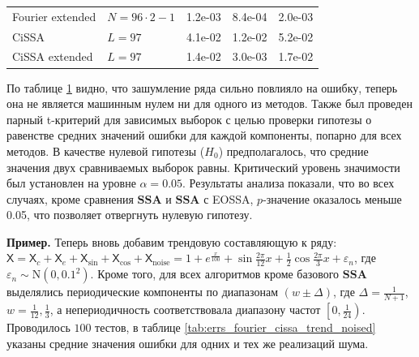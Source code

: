 \documentclass[a4paper, 11pt]{article}
\newcommand{\SSA}{\textbf{SSA}}
\newcommand{\TS}{\mathsf{X}}
\begin{document}
\begin{table}[H]
\begin{tabular}{l|l|ccc}
		Fourier extended   & $N = 96 \cdot 2 - 1$ & 1.2e-03                          & 8.4e-04                          & 2.0e-03                   \\
		CiSSA              & $L = 97$             & 4.1e-02                          & 1.2e-02                          & 5.2e-02                   \\
		CiSSA extended     & $L = 97$             & 1.4e-02                          & 3.0e-03                          & 1.7e-02                   \\
		\hline
	\end{tabular}
	\label{tab:errs_fourier_cissa_sin_cos_noised}
\end{table}



По таблице \ref{tab:errs_fourier_cissa_sin_cos_noised} видно, что зашумление ряда сильно повлияло на ошибку, теперь она не является машинным нулем ни для одного из методов. Также был проведен парный t-критерий для зависимых выборок с целью проверки гипотезы о равенстве средних значений ошибки для каждой компоненты, попарно для всех методов. В качестве нулевой гипотезы ($H_0$) предполагалось, что средние значения двух сравниваемых выборок равны. Критический уровень значимости был установлен на уровне $\alpha = 0.05$.
Результаты анализа показали, что во всех случаях, кроме сравнения $\SSA$ и $\SSA$ с EOSSA, $p$-значение оказалось меньше 0.05, что позволяет отвергнуть нулевую гипотезу.

\textbf{\large{Пример.}} Теперь вновь добавим трендовую составляющую к ряду: $\TS = \TS_{c} + \TS_e + \TS_{\sin} + \TS_{\cos} + \TS_{\mathrm{noise}} = 1 + e^{\frac{x}{100}} + \sin{\frac{2\pi}{12}x} + \frac{1}{2}\cos{\frac{2\pi}{3}x} + \varepsilon_n$, где $\varepsilon_n \sim \mathrm N(0, 0.1^2)$. Кроме того, для всех алгоритмов кроме базового $\SSA$ выделялись периодические компоненты по диапазонам $\left(w \pm \Delta \right)$, где $\Delta = \frac{1}{N+1}$, $w = \frac{1}{12}, \frac{1}{3}$, а непериодичность соответствовала диапазону частот $\left[0, \frac{1}{24} \right)$. Проводилось $100$ тестов, в таблице \ref{tab:errs_fourier_cissa_trend_noised} указаны средние значения ошибки для одних и тех же реализаций шума.
\end{document}
